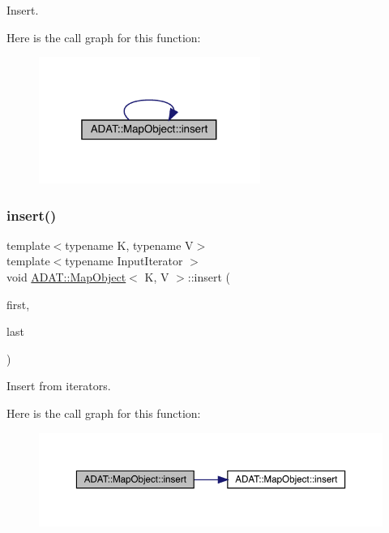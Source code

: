 Insert. 

Here is the call graph for this function\+:\nopagebreak
\begin{figure}[H]
\begin{center}
\leavevmode
\includegraphics[width=205pt]{da/d29/classADAT_1_1MapObject_a5389738841dca1228aefe6935c464a78_cgraph}
\end{center}
\end{figure}
\mbox{\label{classADAT_1_1MapObject_a151aa826b6db5cd124ed13f4a293da2b}} 
\subsubsection{\texorpdfstring{insert()}{insert()}\hspace{0.1cm}{\footnotesize\ttfamily [3/6]}}
{\footnotesize\ttfamily template$<$typename K, typename V$>$ \\
template$<$typename Input\+Iterator $>$ \\
void \mbox{\hyperlink{classADAT_1_1MapObject}{A\+D\+A\+T\+::\+Map\+Object}}$<$ K, V $>$\+::insert (\begin{DoxyParamCaption}\item[{Input\+Iterator}]{first,  }\item[{Input\+Iterator}]{last }\end{DoxyParamCaption})\hspace{0.3cm}{\ttfamily [inline]}}



Insert from iterators. 

Here is the call graph for this function\+:
\nopagebreak
\begin{figure}[H]
\begin{center}
\leavevmode
\includegraphics[width=350pt]{da/d29/classADAT_1_1MapObject_a151aa826b6db5cd124ed13f4a293da2b_cgraph}
\end{center}
\end{figure}
\mbox{\label{classADAT_1_1MapObject_a151aa826b6db5cd124ed13f4a293da2b}} 
